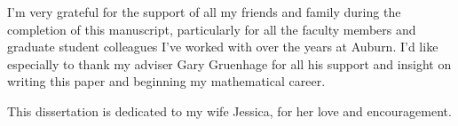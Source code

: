 
\begin{acknowledgments}
I'm very grateful for the support of all my friends and family during
the completion of this manuscript, particularly for all the faculty members
and graduate student colleagues I've worked with over the years at
Auburn. I'd like especially to thank my
adviser Gary Gruenhage for all his support and insight on writing this
paper and beginning my mathematical career.

This dissertation is dedicated to my wife Jessica, for her love and
encouragement.
\end{acknowledgments}